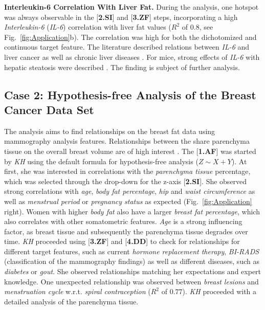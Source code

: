 \documentclass[journal]{style/vgtc} 			          %
\begin{document}
\textbf{Interleukin-6 Correlation With Liver Fat.}
During the analysis, one hotspot was always observable in the [\textbf{2.SI}] and [\textbf{3.ZF}] steps, incorporating a high \emph{Interleukin-6} (\emph{IL-6}) correlation with liver fat values ($R^2$ of $0.8$, see Fig.~\ref{fig:Application}b).
The correlation was high for both the dichotomized and continuous target feature.
The literature described relations between \emph{IL-6} and liver cancer \cite{He2013} as well as chronic liver diseases \cite{Streetz2003}.
For mice, strong effects of \emph{IL-6} with hepatic steatosis were described \cite{Hong2004}.
The finding is subject of further analysis.
\subsection{Case 2: Hypothesis-free Analysis of the Breast Cancer Data Set}
The analysis aims to find relationships on the breast fat data using mammography analysis features.
Relationships between the share parenchyma tissue on the overall breast volume are of high interest \cite{Mccormack2006}.
The [\textbf{1.AF}] was started by \emph{KH} using the default formula for hypothesis-free analysis ($Z \sim X + Y$).
At first, she was interested in correlations with the \emph{parenchyma tissue} percentage, which was selected through the drop-down for the z-axis [\textbf{2.SI}].
She observed strong correlations with \emph{age}, \emph{body fat percentage}, \emph{hip} and \emph{waist circumference} as well as \emph{menstrual period} or \emph{pregnancy status} as expected (Fig.~\ref{fig:Application} right).
Women with higher \emph{body fat} also have a larger \emph{breast fat percentage}, which also correlates with other somatometric features.
\emph{Age} is a strong influencing factor, as breast tissue and subsequently the parenchyma tissue degrades over time.
\emph{KH} proceeded using [\textbf{3.ZF}] and [\textbf{4.DD}] to check for relationships for different target features, such as current \emph{hormone replacement therapy}, \emph{BI-RADS} (classification of the mammography findings) as well as different diseases, such as \emph{diabetes} or \emph{gout}.
She observed relationships matching her expectations and expert knowledge.
One unexpected relationship was observed between \emph{breast lesions} and \emph{menstruation cycle} w.r.t. \emph{spiral contraception} ($R^2$ of $0.77$).
\emph{KH} proceeded with a detailed analysis of the parenchyma tissue.
\end{document}
